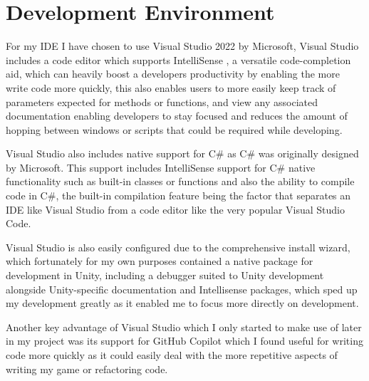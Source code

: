 \section{Development Environment}
\par
For my IDE I have chosen to use Visual Studio 2022 by Microsoft, Visual Studio includes a code editor which supports IntelliSense \cite{Intellisense}, a versatile code-completion aid, which can heavily boost a developers productivity by enabling the more write code more quickly, this also enables users to more easily keep track of parameters expected for methods or functions, and view any associated documentation enabling developers to stay focused and reduces the amount of hopping between windows or scripts that could be required while developing.
\par
Visual Studio also includes native support for C\# as C\# was originally designed by Microsoft. This support includes IntelliSense support for C\# native functionality such as built-in classes or functions and also the ability to compile code in C\#, the built-in compilation feature being the factor that separates an IDE like Visual Studio from a code editor like the very popular Visual Studio Code.
\par
Visual Studio is also easily configured due to the comprehensive install wizard, which fortunately for my own purposes contained a native package for development in Unity, including a debugger suited to Unity development alongside Unity-specific documentation and Intellisense packages, which sped up my development greatly as it enabled me to focus more directly on development.
\par
Another key advantage of Visual Studio which I only started to make use of later in my project was its support for GitHub Copilot which I found useful for writing code more quickly as it could easily deal with the more repetitive aspects of writing my game or refactoring code.